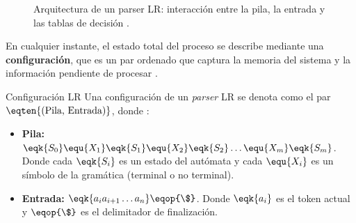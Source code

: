 \begin{figure}[htbp]
    \centering
    \caption{Arquitectura de un parser LR: interacción entre la pila, la entrada y las tablas de decisión \cite{aho2006compilers}.}
    \label{fig:lr_architecture}
\end{figure}

En cualquier instante, el estado total del proceso se describe mediante una \textbf{configuración}, que es un par ordenado que captura la memoria del sistema y la información pendiente de procesar \cite{aho2006compilers}.

\begin{definicion}{Configuración LR}
Una configuración de un \textit{parser} LR se denota como el par $\eqten{(\text{Pila, Entrada})}$, donde \cite{aho2006compilers}:
\begin{itemize}
    \item \textbf{Pila:} $\eqk{S_0} \equ{X_1} \eqk{S_1} \equ{X_2} \eqk{S_2} \dots \equ{X_m} \eqk{S_m}$. Donde cada $\eqk{S_i}$ es un estado del autómata y cada $\equ{X_i}$ es un símbolo de la gramática (terminal o no terminal).
    \item \textbf{Entrada:} $\eqk{a_i a_{i+1} \dots a_n} \eqop{\$}$. Donde $\eqk{a_i}$ es el token actual y $\eqop{\$}$ es el delimitador de finalización.
\end{itemize}
\end{definicion}

